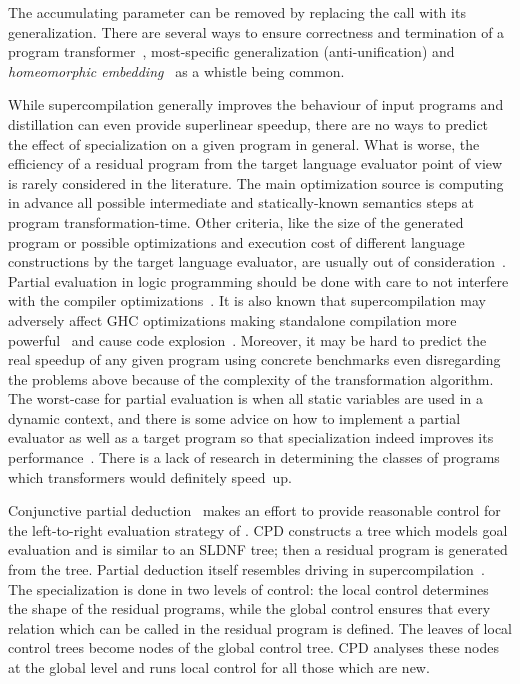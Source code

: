 The accumulating parameter can be removed by replacing the call with its generalization.
There are several ways to ensure correctness and termination of a program transformer~\cite{sorensen1998convergence}, most-specific generalization
(anti-unification) and \emph{homeomorphic embedding}~\cite{Higman52,Kruskal60} as a
whistle being common.

While supercompilation generally improves the behaviour of input programs and distillation can even provide superlinear speedup, there are no ways to predict the effect of specialization on a given program in general.
What is worse, the efficiency of a residual program from the target language evaluator point of view is rarely considered in the literature.
The main optimization source is computing in advance all possible intermediate and statically-known semantics steps at program transformation-time.
Other criteria, like the size of the generated program or possible optimizations and execution cost of different language constructions by the target language evaluator, are usually out of consideration~\cite{jonesbook}.
Partial evaluation in logic programming should be done with care to not interfere with the compiler optimizations~\cite{venken1988partial}.
It is also known that supercompilation may adversely affect GHC optimizations making standalone compilation more powerful~\cite{SCBE,TCES} and cause code explosion~\cite{SCHC}.
Moreover, it may be hard to predict the real speedup of any given program using concrete benchmarks even disregarding the problems above because of the complexity of the transformation algorithm.
The worst-case for partial evaluation is when all static variables are used in a dynamic context, and there is some advice on how to implement a partial evaluator as well as a target program so that specialization indeed improves its performance~\cite{jonesbook,bulyonkov84}.
There is a lack of research in determining the classes of programs which transformers would definitely speed~up.

Conjunctive partial deduction~\cite{de1999conjunctive} makes an effort to provide reasonable control for the left-to-right evaluation strategy of \pro.
CPD constructs a tree which models goal evaluation and is similar to an SLDNF tree; then a residual program is generated from the tree.
Partial deduction itself resembles driving in supercompilation~\cite{gluck1994partial}.
The specialization is done in two levels of control: the local control determines the shape of the residual programs, while the global control ensures that every relation which can be called in the residual program is defined.
The leaves of local control trees become nodes of the global control tree.
CPD analyses these nodes at the global level and runs local control for all those which are new.

